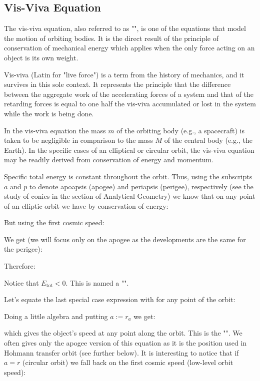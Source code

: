 	\subsection{Vis-Viva Equation}
	 The vis-viva equation, also referred to as "", is one of the equations that model the motion of orbiting bodies. It is the direct result of the principle of conservation of mechanical energy which applies when the only force acting on an object is its own weight.
	 \begin{tcolorbox}[title=Remark,colframe=black,arc=10pt]
	Vis-viva (Latin for "live force") is a term from the history of mechanics, and it survives in this sole context. It represents the principle that the difference between the aggregate work of the accelerating forces of a system and that of the retarding forces is equal to one half the vis-viva accumulated or lost in the system while the work is being done.
	\end{tcolorbox}
	In the vis-viva equation the mass $m$ of the orbiting body (e.g., a spacecraft) is taken to be negligible in comparison to the mass $M$ of the central body (e.g., the Earth). In the specific cases of an elliptical or circular orbit, the vis-viva equation may be readily derived from conservation of energy and momentum.

	Specific total energy is constant throughout the orbit. Thus, using the subscripts $a$ and $p$ to denote apoapsis (apogee) and periapsis (perigee), respectively (see the study of conics in the section of Analytical Geometry) we know that on any point of an elliptic orbit we have by conservation of energy:
	
	But using the first cosmic speed:
	
	We get (we will focus only on the apogee as the developments are the same for the perigee):
	
	Therefore:
	
	Notice that $E_\text{tot} < 0$. This is named a "".
	
	Let's equate the last special case expression with for any point of the orbit:
	
	Doing a little algebra and putting $a:=r_a$ we get:
	
	which gives the object's speed at any point along the orbit. This is the "". We often gives only the apogee version of this equation as it is the position used in Hohmann transfer orbit (see further below). It is interesting to notice that if $a=r$ (circular orbit) we fall back on the first cosmic speed (low-level orbit speed):
	
